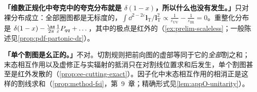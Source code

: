 \begin{tcolorbox}[enhanced,breakable,title=常见误解,fonttitle=\bfseries,
  colback=gray!3!white,colframe=gray!55!black,boxrule=0.6pt,arc=2pt,
  left=5pt,right=5pt,top=3pt,bottom=3pt,before skip=6pt,after skip=6pt]
\textbf{「维数正规化中夸克中的夸克分布就是 $\delta(1-x)$，所以什么也没有发生。」}只对裸分布成立：全部圈图都是无标度的，$\int\dd^{2-2\varepsilon}\mathbf l_{\mathrm T}/\mathbf l_{\mathrm T}^2\propto\frac1{\varepsilon_{\mathrm{UV}}}-\frac1{\varepsilon_{\mathrm{IR}}}=0$。重整化分布是 $\delta(1-x)-\frac{\as}{2\pi}\frac1\varepsilon P_{qq}+\dots$，其中的极点是红外的（\cref{ex:prelim-scaleless}；一般陈述见\cref{prop:pdf-partonic-dr}）。\par
\textbf{「单个割图是幺正的。」}不对。切割规则把前向图的虚部等同于它的\emph{全部}割之和；末态相互作用以及虚修正与实辐射的抵消只在对割线位置求和后发生，单个割图甚至是红外发散的（\cref{prop:ee-cutting-exact}）。因子化中末态相互作用的相消正是这样的割线求和（\cref{prop:method-fsi}，第~9~章；精确形式见\cref{lem:appO-unitarity}）。
\end{tcolorbox}

